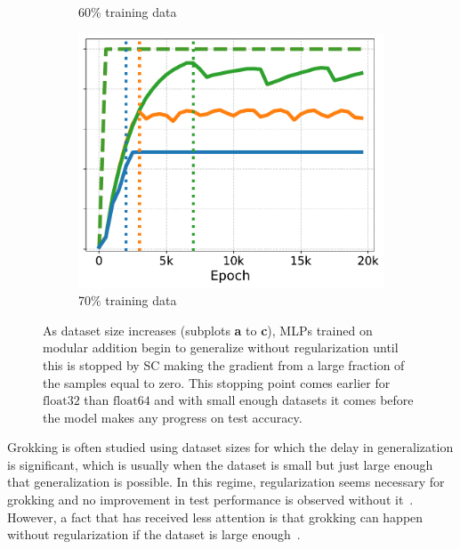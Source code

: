 \begin{figure}[t]
\begin{subfigure}{.32\textwidth}
  \caption{60\% training data}
  \label{fig:grokking_stops_60}
\end{subfigure}
\hfill
\begin{subfigure}{.32\textwidth}
  \centering
  \includegraphics[width=\linewidth]{grokking_iclr_arxiv/figures/float32vsfloat64_70_percent_no_legend.pdf}
  \caption{70\% training data}
  \label{fig:grokking_stops_70}
\end{subfigure}
\caption{As dataset size increases (subplots \textbf{a} to \textbf{c}), MLPs trained on modular addition begin to generalize without regularization until this is stopped by SC making the gradient from a large fraction of the samples equal to zero. This stopping point comes earlier for $\mathrm{float32}$ than $\mathrm{float64}$ and with small enough datasets it comes before the model makes any progress on test accuracy.\vspace{-3mm}}
\label{fig:grokking_stops}
\end{figure}

\label{sec:evidence-of-sc}
Grokking is often studied using dataset sizes for which the delay in generalization is significant, which is usually when the dataset is small but just large enough that generalization is possible. In this regime, regularization seems necessary for grokking and no improvement in test performance is observed without it~\citep{Nanda2023-hf}. However, a fact that has received less attention is that grokking can happen without regularization if the dataset is large enough~\citep{power2022grokking}.

